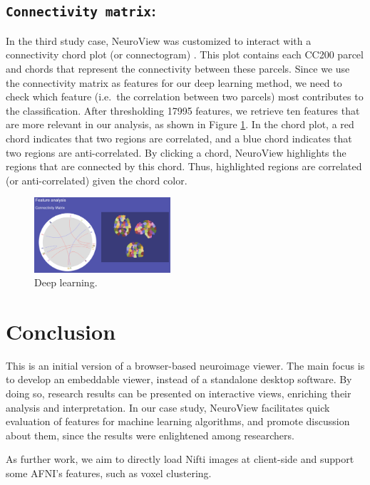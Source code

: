 \documentclass[twocolumn]{bmcart}%
\begin{document}
\subsection{\texorpdfstring{\texttt{Connectivity matrix}:}{:}}\label{section-2}

In the third study case, NeuroView was customized to interact with a
connectivity chord plot (or connectogram) \cite{Irimia2012}. This plot
contains each CC200 parcel and chords that represent the connectivity
between these parcels. Since we use the connectivity matrix as features
for our deep learning method, we need to check which feature (i.e.~the
correlation between two parcels) most contributes to the classification.
After thresholding 17995 features, we retrieve ten features that are
more relevant in our analysis, as shown in Figure
\ref{fig:deeplearning}. In the chord plot, a red chord indicates that
two regions are correlated, and a blue chord indicates that two regions
are anti-correlated. By clicking a chord, NeuroView highlights the
regions that are connected by this chord. Thus, highlighted regions are
correlated (or anti-correlated) given the chord color.

\begin{figure}[ht]
\centering
\includegraphics[width=0.45\textwidth]{figs/deeplearning.png}
\caption{Deep learning.}
\label{fig:deeplearning}
\end{figure}

\section{Conclusion}\label{conclusion}

This is an initial version of a browser-based neuroimage viewer. The
main focus is to develop an embeddable viewer, instead of a standalone
desktop software. By doing so, research results can be presented on
interactive views, enriching their analysis and interpretation. In our
case study, NeuroView facilitates quick evaluation of features for
machine learning algorithms, and promote discussion about them, since
the results were enlightened among researchers.

As further work, we aim to directly load Nifti images at client-side and
support some AFNI's features, such as voxel clustering.
\end{document}
